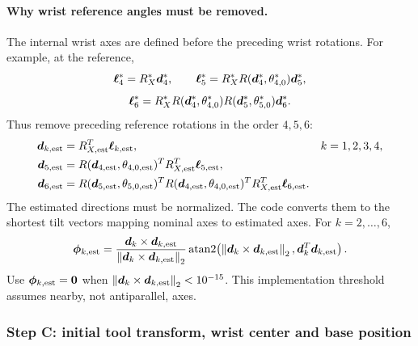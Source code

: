 \documentclass[../main.tex]{subfiles}
\begin{document}
\paragraph{Why wrist reference angles must be removed.}
The internal wrist axes are defined before the preceding wrist rotations. For example, at the reference,
\begin{equation*}
\bm{\ell}_4^*=R_X^*\bm{d}_4^*,\qquad
\bm{\ell}_5^*=R_X^*R(\bm{d}_4^*,\theta^*_{4,0})\bm{d}_5^*,
\end{equation*}
\begin{equation*}
\bm{\ell}_6^*=R_X^*R(\bm{d}_4^*,\theta^*_{4,0})R(\bm{d}_5^*,\theta^*_{5,0})\bm{d}_6^*.
\end{equation*}
Thus remove preceding reference rotations in the order $4,5,6$:
\begin{equation*}
\begin{aligned}
\bm{d}_{k,\mathrm{est}}&=R_{X,\mathrm{est}}^T\bm{\ell}_{k,\mathrm{est}},&&k=1,2,3,4,\\
\bm{d}_{5,\mathrm{est}}&=R(\bm{d}_{4,\mathrm{est}},\theta_{4,0,\mathrm{est}})^TR_{X,\mathrm{est}}^T\bm{\ell}_{5,\mathrm{est}},\\
\bm{d}_{6,\mathrm{est}}&=R(\bm{d}_{5,\mathrm{est}},\theta_{5,0,\mathrm{est}})^T
R(\bm{d}_{4,\mathrm{est}},\theta_{4,0,\mathrm{est}})^TR_{X,\mathrm{est}}^T\bm{\ell}_{6,\mathrm{est}}.
\end{aligned}
\end{equation*}
The estimated directions must be normalized. The code converts them to the shortest tilt vectors mapping nominal axes to estimated axes. For $k=2,\dots,6$,
\begin{equation*}
\bm{\phi}_{k,\mathrm{est}}=
\frac{\bm{d}_k\times\bm{d}_{k,\mathrm{est}}}{\left\|\bm{d}_k\times\bm{d}_{k,\mathrm{est}}\right\|_2}
\operatorname{atan2}\!\left(\left\|\bm{d}_k\times\bm{d}_{k,\mathrm{est}}\right\|_2,\bm{d}_k^T\bm{d}_{k,\mathrm{est}}\right).
\end{equation*}
Use $\bm{\phi}_{k,\mathrm{est}}=\bm{0}$ when $\left\|\bm{d}_k\times\bm{d}_{k,\mathrm{est}}\right\|_2<10^{-15}$. This implementation threshold assumes nearby, not antiparallel, axes.

\subsubsection{Step C: initial tool transform, wrist center and base position}\label{sec:math-tool-init}
\end{document}
